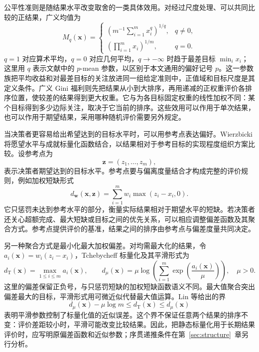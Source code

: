 公平性准则是随结果水平改变取舍的一类具体效用。对经过尺度处理、可以共同比较的正结果，广义均值为
\begin{equation}
M_q(\mathbf x)=
\begin{cases}
\left(m^{-1}\sum_{i=1}^m x_i^q\right)^{1/q},&q\neq0,\\
\left(\prod_{i=1}^m x_i\right)^{1/m},&q=0.
\end{cases}
\end{equation}
$q=1$ 对应算术平均，$q=0$ 对应几何平均，$q\to-\infty$ 时趋于最差目标 $\min_i x_i$；这里用 $q$ 表示文献中的 $p$-mean 参数，以区别于本文通用的偏好记号 $p$。这一参数族把平均收益和对最差目标的关注放进同一组给定准则中，正值域和目标尺度是其定义条件\cite{kim2025portfolio}。广义 Gini 福利则先把结果从小到大排序，再用递减的正权重评价各排序位置，使较差的结果得到更大权重\cite{siddique2020fair}。它与为各目标固定权重的线性加权不同：某个目标得到多少边际关注，取决于它当前的排序。这些效用可以作用于单次结果，也可以作用于期望结果，采用哪种随机评价需要另外规定。

当决策者更容易给出希望达到的目标水平时，可以用参考点表达偏好。Wierzbicki 将愿望水平与成就标量化函数结合，以结果相对于参考目标的实现程度组织方案比较\cite{wierzbicki1982}。设参考点为
\begin{equation}
\mathbf{z}=\left(z_{1},\ldots,z_{m}\right),
\end{equation}
表示决策者期望达到的目标水平。参考点要与偏离度量结合才构成完整的评价规则，例如加权短缺形式
\begin{equation}
d_{\mathbf{w}}(\mathbf{x},\mathbf{z})
=
\sum_{i=1}^{m}
w_{i}\max\left(z_{i}-x_{i},0\right).
\end{equation}
它只惩罚未达到参考水平的部分，衡量实际结果相对于期望水平的短缺。若决策者还关心超额完成、最大短缺或目标之间的优先关系，可以相应调整偏差函数及其聚合方式。参考点提供评价的基准，结果之间的排序由参考点与偏差度量共同决定\cite{wang2017}。

另一种聚合方式是最小化最大加权偏差。对均需最大化的结果，令 $a_i(\mathbf x)=w_i(z_i-x_i)$，Tchebycheff 标量化及其平滑形式为
\begin{equation}
d_{\mathrm T}(\mathbf x)=\max_{1\leq i\leq m}a_i(\mathbf x),
\qquad
d_{\mu}(\mathbf x)=\mu\log\!\left(\sum_{i=1}^{m}\exp\!\left(\frac{a_i(\mathbf x)}{\mu}\right)\right),
\quad \mu>0.
\end{equation}
这里的偏差保留正负号，与只惩罚短缺的加权短缺函数语义不同。最大值聚合突出偏差最大的目标，平滑形式用可微近似代替最大值运算。Lin 等给出的界
\begin{equation}
d_{\mu}(\mathbf x)-\mu\log m\leq d_{\mathrm T}(\mathbf x)\leq d_{\mu}(\mathbf x)
\end{equation}
表明平滑参数控制了标量化值的近似误差\cite{lin2024smooth}。这个界不保证任意两个结果的排序不变：评价差距较小时，平滑可能改变比较结果。因此，把静态标量化用于长期结果评价时，应写明原偏差函数和近似参数；序贯递推条件在第~\ref{sec:structure}~章另行分析。


